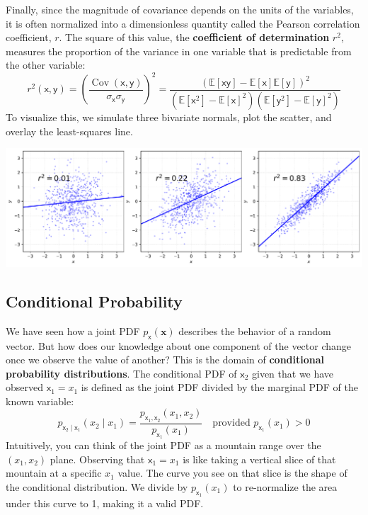 Finally, since the magnitude of covariance depends on the units of the variables, it is often normalized into a dimensionless quantity called the Pearson correlation coefficient, $r$. The square of this value, the \textbf{coefficient of determination} $r^2$, measures the proportion of the variance in one variable that is predictable from the other variable:
\begin{equation}
    r^2(\mathsf{x}, \mathsf{y}) 
    = \left(\frac{\operatorname{Cov}(\mathsf{x}, \mathsf{y})}{\sigma_{\mathsf{x}}\sigma_{\mathsf{y}}}\right)^2
    = \frac{\left(\mathbb{E}[\mathsf{x}\mathsf{y}] - \mathbb{E}[\mathsf{x}]\mathbb{E}[\mathsf{y}]\right)^2}{\left(\mathbb{E}[\mathsf{x}^2] - \mathbb{E}[\mathsf{x}]^2\right)\left(\mathbb{E}[\mathsf{y}^2] - \mathbb{E}[\mathsf{y}]^2\right)}
\end{equation}
To visualize this, we simulate three bivariate normals, plot the scatter, and overlay the least-squares line.
\begin{center}
  \includegraphics[width=\textwidth]{figs/probability/r2_panels.pdf}
\end{center}

\subsection{Conditional Probability}
We have seen how a joint PDF $p_{\mathbf{\mathsf{x}}}(\mathbf{x})$ describes the behavior of a random vector. But how does our knowledge about one component of the vector change once we observe the value of another? This is the domain of \textbf{conditional probability distributions}. The conditional PDF of $\mathsf{x}_2$ given that we have observed $\mathsf{x}_1=x_1$ is defined as the joint PDF divided by the marginal PDF of the known variable:
\begin{equation}
    p_{\mathsf{x}_2 \mid \mathsf{x}_1}(x_2 \mid x_1) = \frac{p_{\mathsf{x}_1, \mathsf{x}_2}(x_1, x_2)}{p_{\mathsf{x}_1}(x_1)} \quad \text{provided } p_{\mathsf{x}_1}(x_1) > 0
\end{equation}
Intuitively, you can think of the joint PDF as a mountain range over the $(x_1, x_2)$ plane. Observing that $\mathsf{x}_1=x_1$ is like taking a vertical slice of that mountain at a specific $x_1$ value. The curve you see on that slice is the shape of the conditional distribution. We divide by $p_{\mathsf{x}_1}(x_1)$ to re-normalize the area under this curve to 1, making it a valid PDF.

